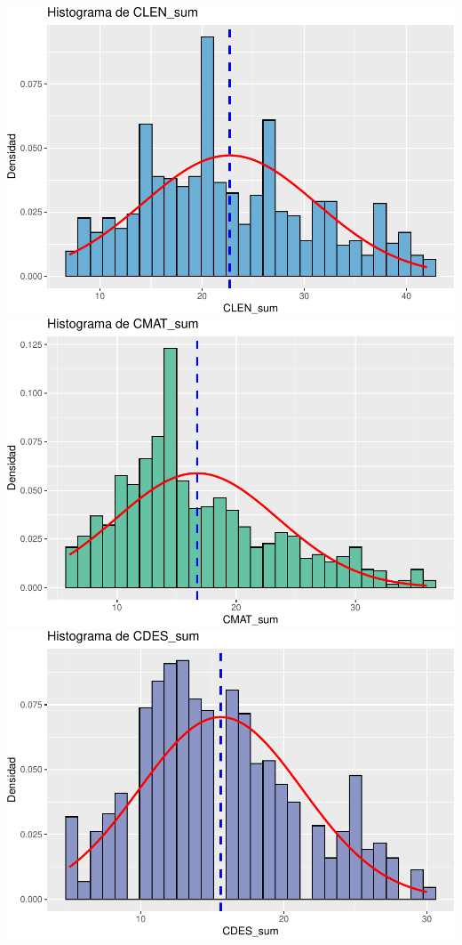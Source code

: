 \documentclass[
]{article}
\begin{document}
\includegraphics{Info_Dinix_02_files/figure-latex/30_Histos-1.pdf}
\includegraphics{Info_Dinix_02_files/figure-latex/30_Histos-2.pdf}
\includegraphics{Info_Dinix_02_files/figure-latex/30_Histos-3.pdf}
\end{document}
